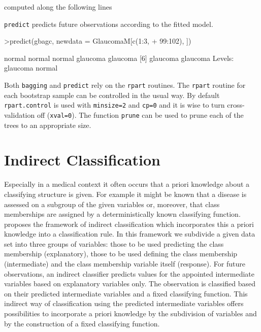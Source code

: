 \documentclass[11pt]{article}
\begin{document}
computed along the following lines
\begin{Schunk}
\end{Schunk}
\texttt{predict} predicts future observations according to the 
fitted model.
\begin{Schunk}
\begin{Sinput}
>predict(gbagc, newdata = GlaucomaM[c(1:3, 
+     99:102), ])
\end{Sinput}
\begin{Soutput}
[1] normal   normal   normal   glaucoma glaucoma
[6] glaucoma glaucoma
Levels: glaucoma normal
\end{Soutput}
\end{Schunk}
Both \texttt{bagging} and \texttt{predict} rely on the \texttt{rpart}
routines.  The \texttt{rpart} routine for each bootstrap sample
can be controlled in the usual way. By default \texttt{rpart.control} is used
with \texttt{minsize=2} and \texttt{cp=0} and it is wise to turn
cross-validation off (\texttt{xval=0}). The function \texttt{prune} can
be used to prune each of the trees to an
appropriate size.

\section{Indirect Classification}
Especially in a medical context it often occurs that a priori 
knowledge about a classifying structure is given. For example 
it might be known that a disease is assessed on a subgroup of 
the given variables or, moreover, that class memberships are 
assigned by a deterministically known classifying function. 
\cite{hand:2001} proposes the framework of indirect classification 
which incorporates this a priori knowledge into a classification rule. 
In this framework we subdivide a given data set into three groups of 
variables: those to be used  predicting the class membership 
(explanatory), those to be used defining the class membership 
(intermediate) and the class membership variable itself (response). 
For future observations, an indirect classifier predicts values 
for the appointed intermediate variables based
on explanatory variables only. The observation is classified 
based on their predicted intermediate variables and a fixed 
classifying function. This indirect way of classification using 
the predicted intermediate variables offers possibilities to 
incorporate a priori knowledge by the subdivision of variables and 
by the construction of a fixed classifying function.
\end{document}
